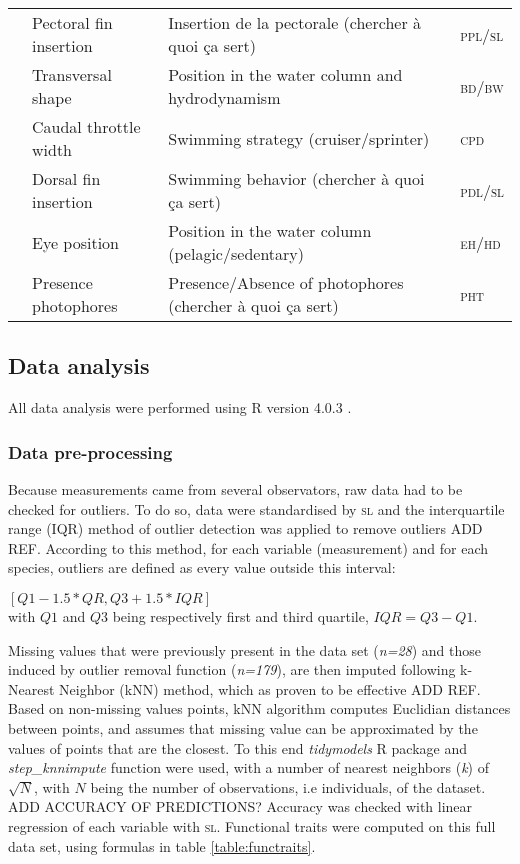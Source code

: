 \begin{sidewaystable}
\begin{tabular}{>{\bfseries}lll>{\scshape}l}
  &Pectoral fin insertion & Insertion de la pectorale (chercher à quoi ça sert) & ppl/sl \\ 
  &Transversal shape & Position in the water column and hydrodynamism & bd/bw \\ 
  &Caudal throttle width & Swimming strategy (cruiser/sprinter) & cpd \\ 
  &Dorsal fin insertion & Swimming behavior (chercher à quoi ça sert) & pdl/sl \\ 
  \hline
  \multirow{2}{*}{Others} &Eye position & Position in the water column (pelagic/sedentary) & eh/hd \\ 
  &Presence photophores & Presence/Absence of photophores (chercher à quoi ça sert) & pht \\ 
   \hline
\end{tabular}
\end{sidewaystable}

\subsection{Data analysis}
All data analysis were performed using \textsf{R} version 4.0.3 \citet{rcoreteam2021}.

\subsubsection{Data pre-processing}
Because measurements came from several observators, raw data had to be checked for outliers. To do so, data were standardised by \textsc{sl} and the interquartile range (IQR) method of outlier detection was applied to remove outliers ADD REF. According to this method, for each variable (measurement) and for each species, outliers are defined as every value outside this interval: 
\begin{center}
$ [Q1 - 1.5*QR, Q3 + 1.5*IQR]$ \\
with $Q1$ and $Q3$ being respectively first and third quartile, $IQR = Q3 - Q1$. 
\end{center}{}


Missing values that were previously present in the data set (\textit{n=28}) and those induced by outlier removal function (\textit{n=179}), are then imputed following k-Nearest Neighbor (kNN) method, which as proven to be effective ADD REF. Based on non-missing values points, kNN algorithm computes Euclidian distances between points, and assumes that missing value can be approximated by the values of points that are the closest. To this end \emph{tidymodels} R package and \emph{step\_knnimpute} function \citep{kuhn2020} were used, with a number of nearest neighbors (\textit{k}) of $\sqrt{N}$, with $N$ being the number of observations, i.e individuals, of the dataset. ADD ACCURACY OF PREDICTIONS? Accuracy was checked with linear regression of each variable with \textsc{sl}. Functional traits were computed on this full data set, using formulas in table \ref{table:functraits}. 

